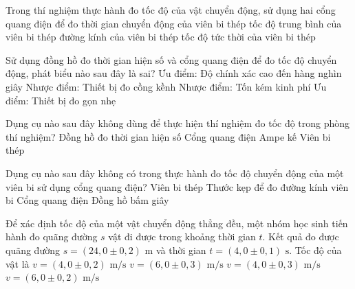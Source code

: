 \begin{ex} Trong thí nghiệm thực hành đo tốc độ của vật chuyển động, sử dụng hai cổng quang điện để đo
\choice
{\True thời gian chuyển động của viên bi thép}
{tốc độ trung bình của viên bi thép}
{đường kính của viên bi thép}
{tốc độ tức thời của viên bi thép}
\end{ex}

\begin{ex} Sử dụng đồng hồ đo thời gian hiện số và cổng quang điện để đo tốc độ chuyển động, phát biểu nào sau đây là sai?
\choice
{Ưu điểm: Độ chính xác cao đến hàng nghìn giây}
{Nhược điểm: Thiết bị đo cồng kềnh}
{Nhược điểm: Tốn kém kinh phí}
{\True Ưu điểm: Thiết bị đo gọn nhẹ}
\end{ex}

\begin{ex} Dụng cụ nào sau đây không dùng để thực hiện thí nghiệm đo tốc độ trong phòng thí nghiệm?
\choice
{Đồng hồ đo thời gian hiện số}
{Cổng quang điện}
{\True Ampe kế}
{Viên bi thép}
\end{ex}

\begin{ex} Dụng cụ nào sau đây không có trong thực hành đo tốc độ chuyển động của một viên bi sử dụng cổng quang điện?
\choice
{Viên bi thép}
{\True Thước kẹp để đo đường kính viên bi}
{Cổng quang điện}
{Đồng hồ bấm giây}
\end{ex}

\begin{ex} Để xác định tốc độ của một vật chuyển động thẳng đều, một nhóm học sinh tiến hành đo quãng đường $s$ vật đi được trong khoảng thời gian $t$. Kết quả đo được quãng đường $s = (24{,}0 \pm 0{,}2)\text{ m}$ và thời gian $t = (4{,}0 \pm 0{,}1)\text{ s}$. Tốc độ của vật là
\choice
{$v = (4{,}0 \pm 0{,}2)\text{ m/s}$}
{$v = (6{,}0 \pm 0{,}3)\text{ m/s}$}
{$v = (4{,}0 \pm 0{,}3)\text{ m/s}$}
{\True $v = (6{,}0 \pm 0{,}2)\text{ m/s}$}
\end{ex}

